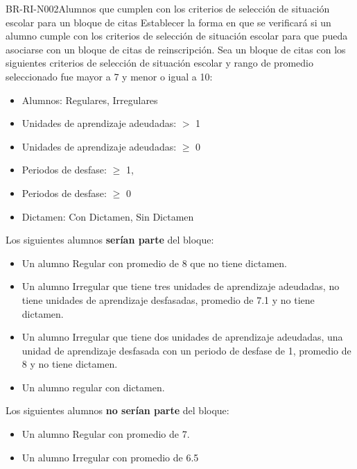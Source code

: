 \begin{BusinessRule}{BR-RI-N002}{Alumnos que cumplen con los criterios de selección de situación escolar para un bloque de citas}
	\BRItem[Motivación] Establecer la forma en que se verificará si un alumno cumple con los criterios de selección de situación escolar para que pueda asociarse con un bloque de citas de reinscripción.
	\BRItem[Ejemplo] Sea un bloque de citas con los siguientes criterios de selección de situación escolar y rango de promedio seleccionado fue mayor a 7 y menor o igual a 10:
			\begin{itemize}
				\item Alumnos: Regulares, Irregulares
				\item Unidades de aprendizaje adeudadas: $>$ 1
				\item Unidades de aprendizaje adeudadas: $\geq$ 0
				\item Periodos de desfase: $\geq$ 1, 
				\item Periodos de desfase: $\geq$ 0
				\item Dictamen: Con Dictamen, Sin Dictamen
			\end{itemize}
		
		Los siguientes alumnos {\bf serían parte} del bloque:
			\begin{itemize}
				\item Un alumno Regular con promedio de 8 que no tiene dictamen.
				\item Un alumno Irregular que tiene tres unidades de aprendizaje adeudadas, no tiene unidades de aprendizaje desfasadas, promedio de 7.1 y no tiene dictamen.
				\item Un alumno Irregular que tiene dos unidades de aprendizaje adeudadas, una unidad de aprendizaje desfasada con un periodo de desfase de 1, promedio de 8 y no tiene dictamen.
				\item Un alumno regular con dictamen.
			\end{itemize}
		
		Los siguientes alumnos {\bf no serían parte} del bloque:
			\begin{itemize}
				\item Un alumno Regular con promedio de 7.
				\item Un alumno Irregular con promedio de 6.5
			\end{itemize}
	
\end{BusinessRule}


